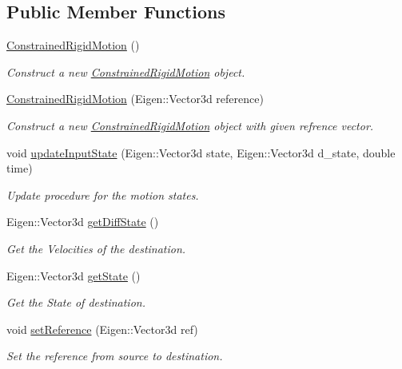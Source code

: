 \subsection*{Public Member Functions}
\begin{DoxyCompactItemize}
\item 
\hyperlink{group__RigidMotion_gaa85deb237e7407287829b6596997b210}{Constrained\+Rigid\+Motion} ()
\begin{DoxyCompactList}\small\item\em Construct a new \hyperlink{classConstrainedRigidMotion}{Constrained\+Rigid\+Motion} object. \end{DoxyCompactList}\item 
\hyperlink{group__RigidMotion_ga603d9727e46dc49dcf22b24870d15779}{Constrained\+Rigid\+Motion} (Eigen\+::\+Vector3d reference)
\begin{DoxyCompactList}\small\item\em Construct a new \hyperlink{classConstrainedRigidMotion}{Constrained\+Rigid\+Motion} object with given refrence vector. \end{DoxyCompactList}\item 
void \hyperlink{group__RigidMotion_ga80649fcba3aed41550ba463f405d051b}{update\+Input\+State} (Eigen\+::\+Vector3d state, Eigen\+::\+Vector3d d\+\_\+state, double time)
\begin{DoxyCompactList}\small\item\em Update procedure for the motion states. \end{DoxyCompactList}\item 
Eigen\+::\+Vector3d \hyperlink{group__RigidMotion_ga59bdced4bb2e565bc39312e5328507ef}{get\+Diff\+State} ()
\begin{DoxyCompactList}\small\item\em Get the Velocities of the destination. \end{DoxyCompactList}\item 
Eigen\+::\+Vector3d \hyperlink{group__RigidMotion_gabde902d2f91035cd5054a33dab4acc48}{get\+State} ()
\begin{DoxyCompactList}\small\item\em Get the State of destination. \end{DoxyCompactList}\item 
void \hyperlink{group__RigidMotion_gac71f6e395c1d63f54cfb837b5526236b}{set\+Reference} (Eigen\+::\+Vector3d ref)
\begin{DoxyCompactList}\small\item\em Set the reference from source to destination. \end{DoxyCompactList}\end{DoxyCompactItemize}
